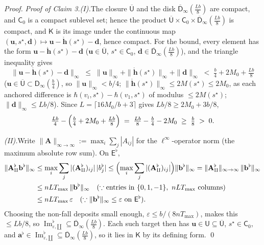 \documentclass[11pt]{article}
\theoremstyle{definition}
\begin{document}
\begin{proof}
\noindent\emph{Proof of Claim 3.}\quad \textit{(I).}\quad The closure $\overline{\mathsf{U}}$ and the disk $\overline{\mathsf{D}}_\infty(\tfrac{Lb}{8})$ are compact, and $\mathsf{C}_0$ is a compact sublevel set; hence the product $\overline{\mathsf{U}}\times\mathsf{C}_0\times\overline{\mathsf{D}}_\infty(\tfrac{Lb}{8})$ is compact, and $\mathsf{K}$ is its image under the continuous map $(\mathbf{u},s^{\star},\mathbf{d})\mapsto\mathbf{u}-\mathring{\mathbf{h}}(s^{\star})-\mathbf{d}$, hence compact. For the bound, every element has the form $\mathbf{u}-\mathring{\mathbf{h}}(s^{\star})-\mathbf{d}$ ($\mathbf{u}\in\overline{\mathsf{U}}$, $s^{\star}\in\mathsf{C}_0$, $\mathbf{d}\in\overline{\mathsf{D}}_\infty(\tfrac{Lb}{8})$), and the triangle inequality gives
\[
  \|\mathbf{u}-\mathring{\mathbf{h}}(s^{\star})-\mathbf{d}\|_\infty \;\leq\; \|\mathbf{u}\|_\infty + \|\mathring{\mathbf{h}}(s^{\star})\|_\infty + \|\mathbf{d}\|_\infty \;<\; \tfrac{b}{4} + 2M_0 + \tfrac{Lb}{8}
\]
($\mathbf{u}\in \overline{\mathsf{U}}\subset\mathsf{D}_\infty(\tfrac{b}{4})$, so $\|\mathbf{u}\|_\infty < b/4$; $\|\mathring{\mathbf{h}}(s^{\star})\|_\infty\leq 2M(s^{\star})\leq 2M_0$, as each anchored difference is $\hbar(v_i,s^{\star})-\hbar(v_1,s^{\star})$ of modulus $\leq 2M(s^{\star})$; $\|\mathbf{d}\|_\infty\leq Lb/8$). Since $L = \lceil 16M_0/b + 3\rceil$ gives $Lb/8 \geq 2M_0 + 3b/8$,
\[
  \tfrac{Lb}{4} - \Bigl(\tfrac{b}{4} + 2M_0 + \tfrac{Lb}{8}\Bigr) \;=\; \tfrac{Lb}{8} - \tfrac{b}{4} - 2M_0 \;\geq\; \tfrac{b}{8} \;>\; 0 .
\]

\smallskip\noindent\textit{(II).}\quad Write $\|\mathbf{A}\|_{\infty\to\infty} := \max_i\sum_j|A_{ij}|$ for the $\ell^\infty$-operator norm (the maximum absolute row sum). On $\mathsf{E}^{\flat}$,
\begin{align*}
\|\mathbf{A}^{\flat}_{\amalg}\mathbf{b}^{\flat}\|_\infty
&\leq \max_i \sum_j |(\mathbf{A}^{\flat}_{\amalg})_{ij}|\,|b^{\flat}_j|
\leq \Bigl(\max_i \sum_j |(\mathbf{A}^{\flat}_{\amalg})_{ij}|\Bigr)\|\mathbf{b}^{\flat}\|_\infty
= \|\mathbf{A}^{\flat}_{\amalg}\|_{\infty\to\infty}\,\|\mathbf{b}^{\flat}\|_\infty \\
&\leq nLT_{\max}\,\|\mathbf{b}^{\flat}\|_\infty
   \quad (\because \text{entries in } \{0,1,-1\},\ nLT_{\max} \text{ columns}) \\
&\leq nLT_{\max}\,\varepsilon
   \quad (\because \|\mathbf{b}^{\flat}\|_\infty \leq \varepsilon \text{ on } \mathsf{E}^{\flat}) .
\end{align*}
Choosing the non-fall deposits small enough, $\varepsilon \leq b/(8nT_{\max})$, makes this $\leq Lb/8$, so $\operatorname{Im}^{\flat}_{\varepsilon,\amalg}\subseteq\overline{\mathsf{D}}_\infty(\tfrac{Lb}{8})$. Each such target then has $\mathbf{u}\in\mathsf{U}\subseteq\overline{\mathsf{U}}$, $s^{\star}\in\mathsf{C}_0$, and $\mathbf{a}^{\flat}\in\operatorname{Im}^{\flat}_{\varepsilon,\amalg}\subseteq\overline{\mathsf{D}}_\infty(\tfrac{Lb}{8})$, so it lies in $\mathsf{K}$ by its defining form. \qed


\end{proof}
\end{document}
